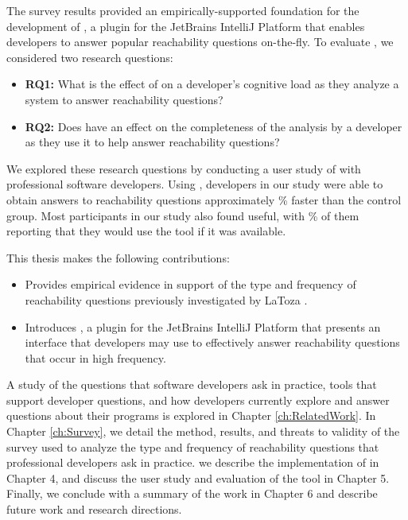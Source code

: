 \par The survey results provided an empirically-supported foundation for the
development of \emph{\toolname{}}, a plugin for the JetBrains IntelliJ Platform 
that enables developers to answer popular reachability questions on-the-fly.
To evaluate \toolname{}, we considered two research questions:

\begin{itemize}
  \item[] \textbf{RQ1:} What is the effect of \toolname{} on a developer's 
  cognitive load as they analyze a system to answer reachability questions?
  \item[] \textbf{RQ2:} Does \toolname{} have an effect on the completeness
  of the analysis by a developer as they use it to help answer reachability 
  questions?
\end{itemize}


We explored these research questions by conducting a user study of \toolname{}
with \userstudynum{} professional software developers.
Using \toolname{}, developers in our study were able to obtain answers to 
reachability questions approximately \fasterpct{}\% faster than the control 
group.
Most participants in our study also found \toolname{} useful, with 
\usefulpct{}\% of them reporting that they would use the tool if it was
available.

\par This thesis makes the following contributions:

\begin{itemize}
  \item Provides empirical evidence in support of the type and frequency of
        reachability questions previously investigated by LaToza \etal{}
        \cite{latoza-2010-reach}.
  \item Introduces \toolname, a plugin for the JetBrains IntelliJ Platform that 
        presents an interface that developers may use to effectively answer 
        reachability questions that occur in high frequency.
\end{itemize}

A study of the questions that software developers ask in practice, tools that
support developer questions, and how developers currently explore and 
answer questions about their programs is explored in Chapter 
\ref{ch:RelatedWork}. In Chapter \ref{ch:Survey}, we detail the method, 
results, and threats to validity of the survey used to analyze the type and 
frequency of reachability questions that professional developers ask in 
practice. we describe the implementation of \toolname{} in Chapter 4, and discuss
the user study and evaluation of the tool in Chapter 5.
Finally, we conclude with a summary of the work in Chapter 6 and describe future
work and research directions.

\endinput

